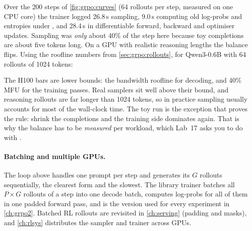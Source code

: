 \begin{systemslens}
Over the 200 steps of \cref{fig:grpo:curves} (64 rollouts per step, measured on one CPU core)
the trainer logged 26.8\,s sampling, 9.0\,s computing old log-probs and entropies under
, and 28.4\,s in differentiable forward, backward and optimiser updates.
Sampling was \emph{only} about 40\% of the step here because toy completions are about five tokens
long. On a GPU with realistic reasoning lengths the balance flips. Using the roofline numbers
from \cref{sec:grpo:rollouts}, for Qwen3-0.6B with 64 rollouts of 1024 tokens:

\smallskip
\centering
{}
\raggedright

\smallskip
The H100 bars are lower bounds: the bandwidth roofline for decoding, and 40\% MFU
for the training passes. Real samplers sit well above their bound, and reasoning
rollouts are far longer than 1024 tokens, so in practice sampling usually accounts for most of
the wall-clock time. The toy run is the exception that proves the rule: shrink the
completions and the training side dominates again. That is why the balance has to be
\emph{measured} per workload, which Lab~17 asks you to do with .
\end{systemslens}

\paragraph{Batching and multiple GPUs.} The loop above handles one prompt per step and
generates its $G$ rollouts sequentially, the clearest form and the slowest. The library trainer
batches all $P\times G$ rollouts of a step into one decode batch, computes log-probs for all
of them in one padded forward pass, and is the version used for every experiment in
\cref{ch:grpo2}. Batched RL rollouts are revisited in \cref{ch:serving} (padding and masks),
and \cref{ch:rlsys} distributes the sampler and trainer across GPUs.

